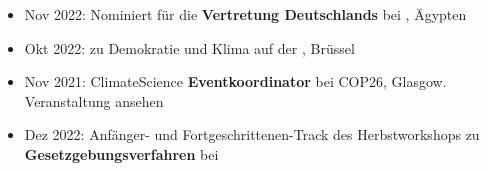 \documentclass[10pt,a4paper,ragged2e,withhyper]{altacv}
\begin{document}
\begin{paracol}{2}
\begin{itemize}
    \item Nov 2022: Nominiert für die \textbf{Vertretung Deutschlands} bei , Ägypten
    \item Okt 2022:  zu Demokratie und Klima auf der  , Brüssel
    \item Nov 2021: ClimateScience \textbf{Eventkoordinator} bei COP26, Glasgow. Veranstaltung  ansehen
\end{itemize}

\begin{itemize}
    \item Dez 2022: Anfänger- und Fortgeschrittenen-Track des Herbstworkshops zu \textbf{Gesetzgebungsverfahren} bei 
\end{itemize}

\newpage





\end{paracol}
\end{document}
